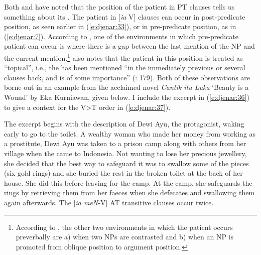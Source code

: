 \documentclass[output=paper
,modfonts
,nonflat]{langsci/langscibook}
\begin{document}
Both \citet[175--178]{Cumming1991} and \citet[222--228]{Kaswanti1988} have noted that the position of the patient in PT clauses tells us something about its . The patient in [\textit{ia} V]  clauses can occur in post-predicate position, as seen earlier in (\ref{e:djenar:33}), or in pre-predicate position, as in (\ref{e:djenar:7}). According to \citet[222]{Kaswanti1988}, one of the environments in which pre-predicate patient can occur is where there is a gap between the last mention of the NP and the current mention.\footnote{According to \citet[222]{Kaswanti1988}, the other two environments in which the patient occurs preverbally are a) when two NPs are contrasted and b) when an NP is promoted from oblique position to argument position.}  \citet[177]{Cumming1991} also notes that the patient in this position is treated as “topical”, i.e., the  has been mentioned “in the immediately previous  or several clauses back, and is of some importance” (\citeyear{Cumming1991}: 179). Both of these observations are borne out in an example from the acclaimed novel \textit{Cantik itu Luka} ‘Beauty is a Wound’ by Eka Kurniawan, given below. I include the excerpt in (\ref{e:djenar:36}) to give a context for the   V>T order in (\ref{e:djenar:37}). 

The excerpt begins with the description of Dewi Ayu, the protagonist, waking early to go to the toilet. A wealthy woman who made her money from working as a prostitute, Dewi Ayu was taken to a prison camp along with others from her village when the  came to Indonesia. Not wanting to lose her precious jewellery, she decided that the best way to safeguard it was to swallow some of the pieces (six gold rings) and she buried the rest in the broken toilet at the back of her house. She did this before leaving for the camp. At the camp, she safeguards the rings by retrieving them from her faeces when she defecates and swallowing them again afterwards. The [\textit{ia meN}-V] AT transitive clauses occur twice.
\end{document}
